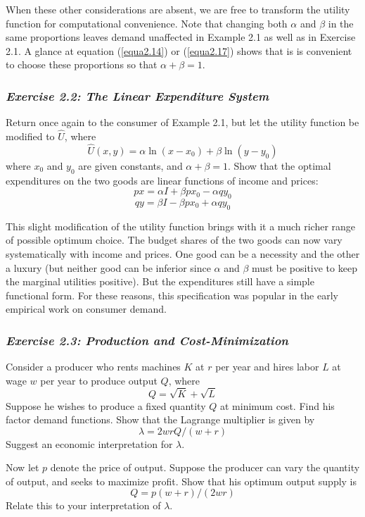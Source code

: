 When these other considerations are absent, we are free to transform the utility function for computational convenience. Note that changing both $\alpha$ and $\beta$ in the same proportions leaves demand unaffected in Example 2.1 as well as in Exercise 2.1. A glance at equation (\ref{equa2.14}) or (\ref{equa2.17}) shows that is is convenient to choose these proportions so that $\alpha + \beta =1$.

\subsubsection*{\textit{Exercise 2.2: The Linear Expenditure System}}

Return once again to the consumer of Example 2.1, but let the utility function be modified to $\hat{U}$, where
\begin{equation*}
\hat{U}(x,y) = \alpha \ln(x-x_0) + \beta \ln(y-y_0)
\end{equation*}
where $x_0$ and $y_0$ are given constants, and $\alpha + \beta=1$. Show that the optimal expenditures on the two goods are linear functions of income and prices:
\begin{equation*}
px = \alpha I + \beta p x_0 - \alpha q y_0
\end{equation*}
\begin{equation*}
qy = \beta I - \beta p x_0 + \alpha q y_0
\end{equation*}

This slight modification of the utility function brings with it a much richer range of possible optimum choice. The budget shares of the two goods can now vary systematically with income and prices. One good can be a necessity and the other a luxury (but neither good can be inferior since $\alpha$ and $\beta$ must be positive to keep the marginal utilities positive). But the expenditures still have a simple functional form. For these reasons, this specification was popular in the early empirical work on consumer demand. 

\subsubsection*{\textit{Exercise 2.3: Production and Cost-Minimization}}

Consider a producer who rents machines $K$ at $r$ per year and hires labor $L$ at wage $w$ per year to produce output $Q$, where
\begin{equation*}
Q = \sqrt{K} + \sqrt{L}
\end{equation*}
Suppose he wishes to produce a fixed quantity $Q$ at minimum cost. Find his factor demand functions. Show that the Lagrange multiplier is given by 
\begin{equation*}
\lambda = 2 w r Q/(w+r)
\end{equation*}
Suggest an economic interpretation for $\lambda$.

Now let $p$ denote the price of output. Suppose the producer can vary the quantity of output, and seeks to maximize profit. Show that his optimum output supply is 
\begin{equation*}
Q = p(w+r)/(2wr)
\end{equation*}
Relate this to your interpretation of $\lambda$.














